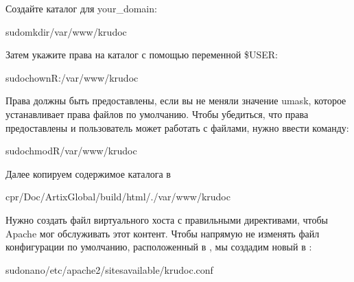 \documentclass[letterpaper,10pt,russian]{sphinxmanual}
\begin{document}
\sphinxAtStartPar
Создайте каталог для your\_domain:

\begin{sphinxVerbatim}[commandchars=\\\{\}]
\PYGZdl{}sudomkdir/var/www/krudoc
\end{sphinxVerbatim}

\sphinxAtStartPar
Затем укажите права на каталог с помощью переменной \$USER:

\begin{sphinxVerbatim}[commandchars=\\\{\}]
\PYGZdl{}sudochown\PYGZhy{}R:/var/www/krudoc
\end{sphinxVerbatim}

\sphinxAtStartPar
Права должны быть предоставлены, если вы не меняли значение umask, которое устанавливает права файлов по умолчанию. Чтобы убедиться,
что права предоставлены и пользователь может работать с файлами, нужно ввести команду:

\begin{sphinxVerbatim}[commandchars=\\\{\}]
\PYGZdl{}sudochmod\PYGZhy{}R/var/www/krudoc
\end{sphinxVerbatim}

\sphinxAtStartPar
Далее копируем содержимое каталога   в  

\begin{sphinxVerbatim}[commandchars=\\\{\}]
\PYGZdl{}cp\PYGZhy{}r\PYGZti{}/Doc/Artix\PYGZus{}Global/build/html/./var/www/krudoc
\end{sphinxVerbatim}

\sphinxAtStartPar
Нужно создать файл виртуального хоста с правильными директивами, чтобы Apache мог обслуживать этот контент.
Чтобы напрямую не изменять файл конфигурации по умолчанию, расположенный
в , мы создадим новый в :

\begin{sphinxVerbatim}[commandchars=\\\{\}]
\PYGZdl{}sudonano/etc/apache2/sites\PYGZhy{}available/krudoc.conf
\end{sphinxVerbatim}
\end{document}
